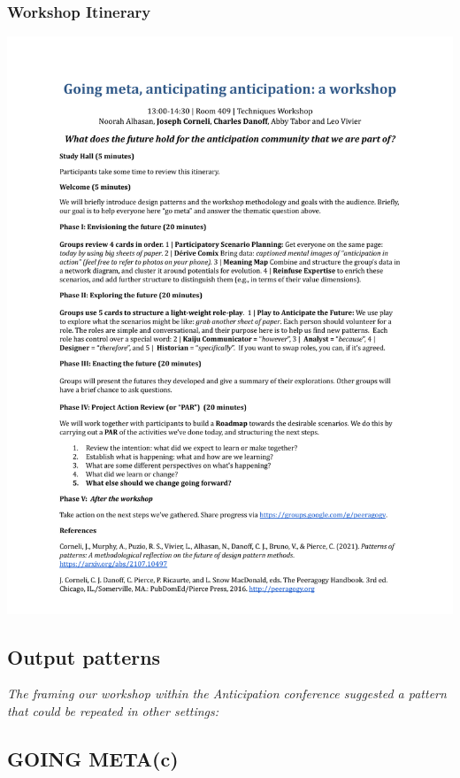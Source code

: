 \documentclass[acmlarge,timestamp]{acmart}
\begin{document}
\clearpage

\subsubsection{Workshop Itinerary}

\begin{mdframed}[backgroundcolor=blue!50,linecolor=blue!50]
  \noindent\includegraphics[width=\textwidth,trim={1cm 4.5cm 1cm 4.5cm},clip=true]{anticipation}
\end{mdframed}

\clearpage

\subsection{Output patterns}

\emph{The framing our workshop within the Anticipation conference suggested a pattern that could be repeated in other settings:}

\subsection*{GOING META{\hfill (c)}}\label{method1}
\label{sec:org958ff04}
\label{PLACARD}
\end{document}
